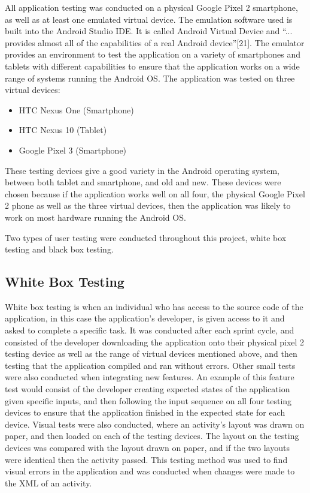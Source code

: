 \documentclass{article}
\begin{document}
All application testing was conducted on a physical Google Pixel 2 smartphone, as well as at least one emulated virtual device. The emulation software used is built into the Android Studio IDE. It is called Android Virtual Device and ``... provides almost all of the capabilities of a real Android device''[21]. The emulator provides an environment to test the application on a variety of smartphones and tablets with different capabilities to ensure that the application works on a wide range of systems running the Android OS. The application was tested on three virtual devices: 

\begin{itemize}
	\item HTC Nexus One (Smartphone)
	\item HTC Nexus 10 (Tablet)
	\item Google Pixel 3 (Smartphone)
\end{itemize}

These testing devices give a good variety in the Android operating system, between both tablet and smartphone, and old and new. These devices were chosen because if the application works well on all four, the physical Google Pixel 2 phone as well as the three virtual devices, then the application was likely to work on most hardware running the Android OS. \par

Two types of user testing were conducted throughout this project, white box testing and black box testing. \par 

\subsection{White Box Testing}

White box testing is when an individual who has access to the source code of the application, in this case the application's developer, is given access to it and asked to complete a specific task. It was conducted after each sprint cycle, and consisted of the developer downloading the application onto their physical pixel 2 testing device as well as the range of virtual devices mentioned above, and then testing that the application compiled and ran without errors. Other small tests were also conducted when integrating new features. An example of this feature test would consist of the developer creating expected states of the application given specific inputs, and then following the input sequence on all four testing devices to ensure that the application finished in the expected state for each device. Visual tests were also conducted, where an activity's layout was drawn on paper, and then loaded on each of the testing devices. The layout on the testing devices was compared with the layout drawn on paper, and if the two layouts were identical then the activity passed. This testing method was used to find visual errors in the application and was conducted when changes were made to the XML of an activity. \par
\end{document}
